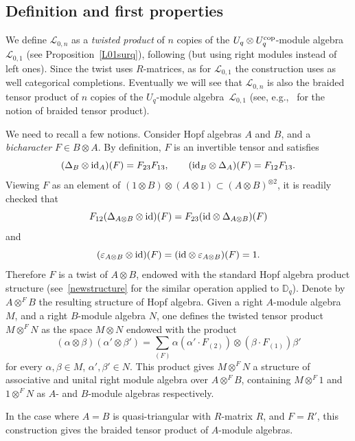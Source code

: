 \documentclass[pdftex]{sigma}%
\numberwithin{equation}{section}
\numberwithin{figure}{section}
\newcommand{\Ll}{{\mathcal L}}
\begin{document}
\subsection{Definition and first properties} We define $\Ll_{0,n}$ as a {\it twisted product} of $n$ copies of the $U_q\otimes U_q^{\rm cop}$-module algebra $\Ll_{0,1}$ (see Proposition~\ref{L01surq}), following \cite{DKM} (but using right modules instead of left ones). Since the twist uses $R$-matrices, as for $\Ll_{0,1}$ the construction uses as well categorical completions. Eventually we will see that $\Ll_{0,n}$ is also the braided tensor product of $n$ copies of the $U_q$-module algebra~$\Ll_{0,1}$ (see, e.g.,~\cite{Majid} for the notion of braided tensor product).

We need to recall a few notions. Consider Hopf algebras $A$ and $B$, and a {\it bicharacter} $F\in B\otimes A$. By definition, $F$ is an invertible tensor and satisfies
\begin{equation}\label{bichar}
(\Delta_{B} \otimes {\rm id}_{A})(F) = F_{23}F_{13} , \qquad ({\rm id}_{B} \otimes \Delta_{A})(F) = F_{12}F_{13} .
\end{equation}
Viewing $F$ as an element of $(1\otimes B)\otimes (A\otimes 1) \subset (A\otimes B)^{\otimes 2}$, it is readily checked that
\[F_{12}(\Delta_{A\otimes B} \otimes {\rm id})(F) = F_{23}({\rm id} \otimes \Delta_{A\otimes B})(F)\]
and \[(\varepsilon_{A\otimes B} \otimes {\rm id})(F) =({\rm id} \otimes \varepsilon_{A\otimes B} )(F) = 1.\]
Therefore $F$ is a twist of $A\otimes B$, endowed with the standard Hopf algebra product structure (see~\eqref{newstructure} for the similar operation applied to ${\mathbb D}_q$). Denote by $A\otimes^F B$ the resulting structure of Hopf algebra. Given a right $A$-module algebra $M$, and a right $B$-module algebra $N$, one defines the twisted tensor product $M\otimes^F N$ as the space $M\otimes N$ endowed with the product
 \begin{equation*}%
 (\alpha \otimes \beta)(\alpha'\otimes \beta') = \sum_{(F)} \alpha (\alpha'\cdot F_{(2)}) \otimes (\beta\cdot F_{(1)})\beta'
 \end{equation*}
for every $\alpha, \beta \in M$, $\alpha', \beta' \in N$. This product gives $M\otimes^F N$ a structure of associative and unital right module algebra over $A\otimes^F B$, containing $M\otimes^F 1$ and $1 \otimes^F N$ as $A$- and $B$-module algebras respectively.
\begin{remk}\label{twistbraided} In the case where $A=B$ is quasi-triangular with $R$-matrix $R$, and $F= R'$, this construction gives the braided tensor product of $A$-module algebras.
\end{remk}
\end{document}
